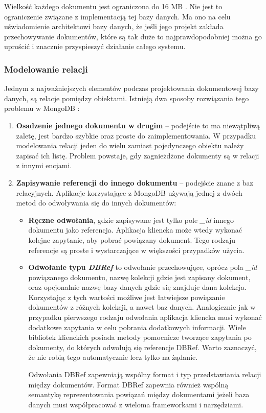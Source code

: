Wielkość każdego dokumentu jest ograniczona do 16 MB \cite{DocumentsManual}.
Nie jest to ograniczenie związane z implementacją tej bazy danych.
Ma ono na celu uświadomienie architektowi bazy danych, że jeśli jego projekt zakłada przechowywanie dokumentów, które są tak duże to najprawdopodobniej można go uprościć i znacznie przyspieszyć działanie całego systemu.

\subsubsection{Modelowanie relacji}

Jednym z najważniejszych elementów podczas projektowania dokumentowej bazy danych, są relacje pomiędzy obiektami.
Istnieją dwa sposoby rozwiązania tego problemu w MongoDB \cite{MongoDBRefs}:
\begin{enumerate}
    \item \textbf{Osadzenie jednego dokumentu w drugim} -- podejście to ma niewątpliwą zaletę, jest bardzo szybkie oraz proste do zaimplementowania.
    W przypadku modelowania relacji jeden do wielu zamiast pojedynczego obiektu należy zapisać ich listę.
    Problem powstaje, gdy zagnieżdżone dokumenty są w relacji z innymi encjami.
    \item \textbf{Zapisywanie referencji do innego dokumentu} -- podejście znane z baz relacyjnych.
    Aplikacje korzystające z MongoDB używają jednej z dwóch metod do odwoływania się do innych dokumentów:
    \begin{itemize}
        \item \textbf{Ręczne odwołania}, gdzie zapisywane jest tylko pole \textit{\_id} innego dokumentu jako referencja.
        Aplikacja kliencka może wtedy wykonać kolejne zapytanie, aby pobrać powiązany dokument.
        Tego rodzaju referencje są proste i wystarczające w większości przypadków użycia.
        \item \textbf{Odwołanie typu \textit{DBRef}} to odwołanie przechowujące, oprócz pola \textit{\_id} powiązanego dokumentu, nazwę kolekcji gdzie jest zapisany dokument, oraz opcjonalnie nazwę bazy danych gdzie się znajduje dana kolekcja.
        Korzystając z tych wartości możliwe jest łatwiejsze powiązanie dokumentów z różnych kolekcji, a nawet baz danych.
        Analogicznie jak w przypadku pierwszego rodzaju odwołania aplikacja kliencka musi wykonać dodatkowe zapytania w celu pobrania dodatkowych informacji.
        Wiele bibliotek klienckich posiada metody pomocnicze tworzące zapytania po dokumenty, do których odwołują się referencje DBRef.
        Warto zaznaczyć, że nie robią tego automatycznie lecz tylko na żądanie.
        
        Odwołania DBRef zapewniają wspólny format i typ przedstawiania relacji między dokumentów.
        Format DBRef zapewnia również wspólną semantykę reprezentowania powiązań między dokumentami jeżeli baza danych musi współpracować z wieloma frameworkami i narzędziami.
    \end{itemize}
\end{enumerate}

